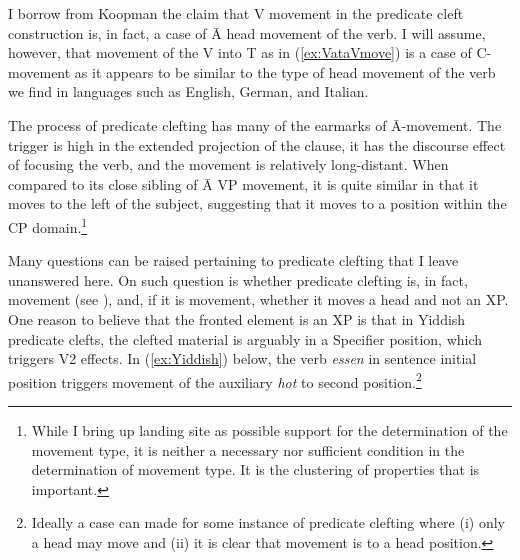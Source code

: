 \documentclass[output=paper,colorlinks,citecolor=brown,
]{langscibook}
\begin{document}
\z

\ea \label{ex:VataVmove}
    \z
\z

I borrow from Koopman the claim that V movement in the predicate cleft construction is, in fact, a case of \=A head movement of the verb.  I will assume, however, that movement of the V into T as in (\ref{ex:VataVmove}) is a case of C-movement as it appears to be similar to the type of head movement of the verb we find in languages such as English, German, and Italian.  

The process of predicate clefting has many of the earmarks of \=A-movement.  The trigger is high in the extended projection of the clause, it has the discourse effect of focusing the verb, and the movement is relatively long-distant.  When compared to its close sibling of \=A VP movement, it is quite similar in that it moves to the left of the subject, suggesting that it moves to a position within the CP domain.\footnote{While I bring up landing site as possible support for the determination of the movement type, it is neither a necessary nor sufficient condition in the determination of movement type.  It is the clustering of properties that is important.}

Many questions can be raised pertaining to predicate clefting that I leave unanswered here.  On such question is whether predicate clefting is, in fact, movement (see \citealt{Cable:2004}), and, if it is movement, whether it moves a head and not an XP.  One reason to believe that the fronted element is an XP is that in Yiddish predicate clefts, the clefted material is arguably in a Specifier position, which triggers V2 effects.  In (\ref{ex:Yiddish}) below, the verb \textit{essen} in sentence initial position triggers movement of the auxiliary \textit{hot} to second position.\footnote{Ideally a case can made for some instance of predicate clefting where (i) only a head may move and (ii) it is clear that movement is to a head position.}
\end{document}
